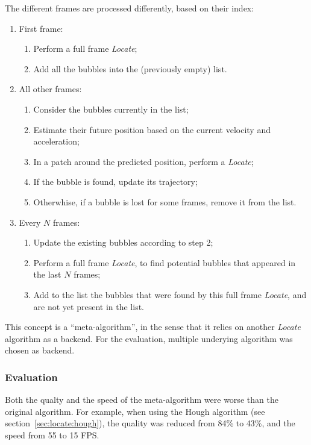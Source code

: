 The different frames are processed differently, based on their index:
\begin{enumerate}
	\itemsep 0em
	\item First frame:
	      \begin{enumerate}
		      \itemsep 0em
		      \item Perform a full frame \textit{Locate};
		      \item Add all the bubbles into the (previously empty) list.
	      \end{enumerate}
	\item All other frames:
	      \begin{enumerate}
		      \itemsep 0em
		      \item Consider the bubbles currently in the list;
		      \item Estimate their future position based on the current velocity and acceleration;
		      \item In a patch around the predicted position, perform a \textit{Locate};
		      \item If the bubble is found, update its trajectory;
		      \item Otherwhise, if a bubble is lost for some frames, remove it from the list.
	      \end{enumerate}
	\item Every $N$ frames:
	      \begin{enumerate}
		      \itemsep 0em
		      \item Update the existing bubbles according to step 2;
		      \item Perform a full frame \textit{Locate}, to find potential bubbles that appeared in the last $N$ frames;
		      \item Add to the list the bubbles that were found by this full frame \textit{Locate}, and are not yet present in the list.
	      \end{enumerate}
\end{enumerate}

This concept is a ``meta-algorithm'', in the sense that it relies on another \textit{Locate} algorithm as a backend.
For the evaluation, multiple underying algorithm was chosen as backend.

\subsubsection{Evaluation}

Both the qualty and the speed of the meta-algorithm were worse than the original algorithm.
For example, when using the Hough algorithm (see section~\ref{sec:locate:hough}), the quality was reduced from 84\% to 43\%, and the speed from 55 to 15 FPS.

